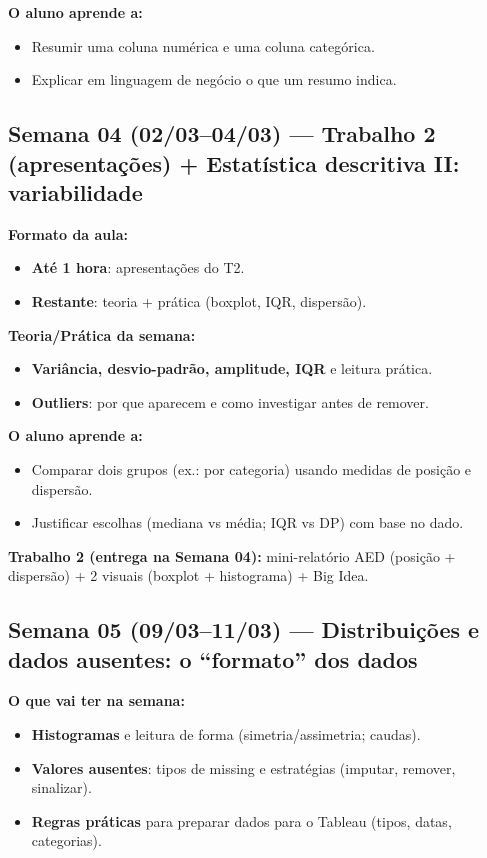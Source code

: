 \textbf{O aluno aprende a:}
\begin{itemize}[leftmargin=*]
  \item Resumir uma coluna numérica e uma coluna categórica.
  \item Explicar em linguagem de negócio o que um resumo indica.
\end{itemize}

\subsection*{Semana 04 (02/03--04/03) --- Trabalho 2 (apresentações) + Estatística descritiva II: variabilidade}
\textbf{Formato da aula:}
\begin{itemize}[leftmargin=*]
  \item \textbf{Até 1 hora}: apresentações do T2.
  \item \textbf{Restante}: teoria + prática (boxplot, IQR, dispersão).
\end{itemize}

\textbf{Teoria/Prática da semana:}
\begin{itemize}[leftmargin=*]
  \item \textbf{Variância, desvio-padrão, amplitude, IQR} e leitura prática.
  \item \textbf{Outliers}: por que aparecem e como investigar antes de remover.
\end{itemize}

\textbf{O aluno aprende a:}
\begin{itemize}[leftmargin=*]
  \item Comparar dois grupos (ex.: por categoria) usando medidas de posição e dispersão.
  \item Justificar escolhas (mediana vs média; IQR vs DP) com base no dado.
\end{itemize}

\begin{SolvedBox}
\textbf{Trabalho 2 (entrega na Semana 04):} mini-relatório AED (posição + dispersão) + 2 visuais (boxplot + histograma) + Big Idea.
\end{SolvedBox}

\subsection*{Semana 05 (09/03--11/03) --- Distribuições e dados ausentes: o ``formato'' dos dados}
\textbf{O que vai ter na semana:}
\begin{itemize}[leftmargin=*]
  \item \textbf{Histogramas} e leitura de forma (simetria/assimetria; caudas).
  \item \textbf{Valores ausentes}: tipos de missing e estratégias (imputar, remover, sinalizar).
  \item \textbf{Regras práticas} para preparar dados para o Tableau (tipos, datas, categorias).
\end{itemize}

